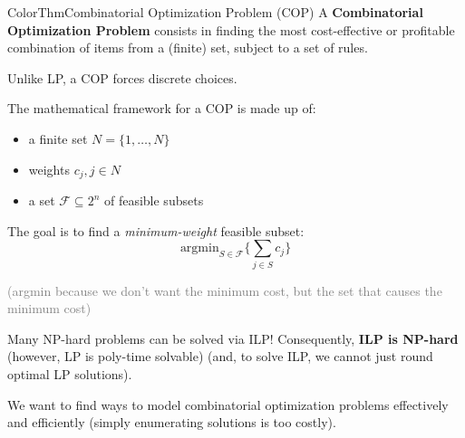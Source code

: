 \documentclass[a4paper, 11pt]{report}
\begin{document}
\begin{cframe}{ColorThm}{Combinatorial Optimization Problem (COP)}
    A \textbf{Combinatorial Optimization Problem} consists in finding the most cost-effective or profitable combination of items from a (finite) set, subject to a set of rules.

    Unlike LP, a COP forces discrete choices.

    The mathematical framework for a COP is made up of:
    \begin{itemize}
        \item a finite set $N = \{1, \dots, N\}$
        \item weights $c_{j}, j \in N$
        \item a set $\mathcal{F}\subseteq 2^{n}$ of feasible subsets
    \end{itemize}

    The goal is to find a \textit{minimum-weight} feasible subset:
    $$ \text{argmin}_{S \in \mathcal{F}} \{ \sum_{j \in S} c_{j}  \} $$

    \textcolor{gray}{(argmin because we don't want the minimum cost, but the set that causes the minimum cost)}
\end{cframe}

Many NP-hard problems can be solved via ILP! Consequently, \textbf{ILP is NP-hard} (however, LP is poly-time solvable) (and, to solve ILP, we cannot just round optimal LP solutions).

We want to find ways to model combinatorial optimization problems effectively and efficiently (simply enumerating solutions is too costly).
\end{document}
